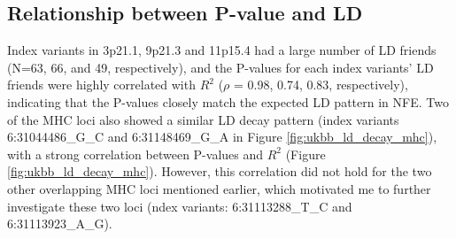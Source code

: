     \subsection{Relationship between P-value and LD} \label{sec:ukbb_postgwas}
  Index variants in 3p21.1, 9p21.3 and 11p15.4 had a large number of LD friends (N=63, 66, and 49, respectively), and the P-values for each index variants' LD friends were highly correlated with $R^{2}$ ($\rho$ = 0.98, 0.74, 0.83, respectively), indicating that the P-values closely match the expected LD pattern in
  NFE. Two of the MHC loci also showed a similar LD decay pattern (index variants 6:31044486\_G\_C and 6:31148469\_G\_A in Figure \ref{fig:ukbb_ld_decay_mhc}), with a strong correlation between P-values and $R^{2}$ (Figure \ref{fig:ukbb_ld_decay_mhc}). However, this correlation did not hold for the two other overlapping MHC loci mentioned earlier, which motivated me to further investigate these two loci (ndex variants: 6:31113288\_T\_C and 6:31113923\_A\_G).
  
